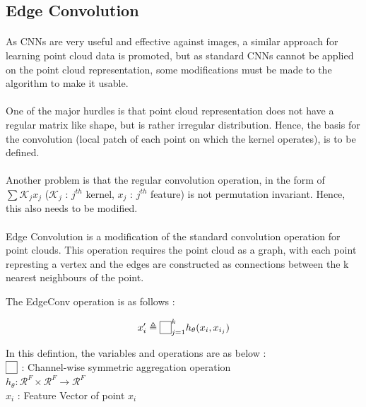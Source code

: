 \subsection{Edge Convolution}

\paragraph{} As CNNs are very useful and effective against images, a similar approach for 
learning point cloud data is promoted, but as standard CNNs cannot be applied 
on the point cloud representation, some modifications must be made to the 
algorithm to make it usable.
\paragraph{} One of the major hurdles is that point cloud representation does not have 
a regular matrix like shape, but is rather irregular distribution. Hence, 
the basis for the convolution (local patch of each point on which the 
kernel operates), is to be defined.
\paragraph{} Another problem is that the regular convolution operation, in the form of 
$\sum \mathcal{K}_jx_j$ ($\mathcal{K}_j$ : $j^{th}$ kernel, $x_j$ : $j^{th}$ 
feature) is not permutation invariant. Hence, this also needs to be 
modified.

\paragraph{} Edge Convolution is a modification of the standard convolution operation 
for point clouds. This operation requires the point cloud as a graph, with 
each point represting a vertex and the edges are constructed as connections 
between the k nearest neighbours of the point.

\begin{definition}{}
    The EdgeConv operation is as follows :

    \begin{equation*}
        x_i' \triangleq \fbox{$\phantom{5}$}_{j=1}^k h_\theta(x_i,x_{i_j})
    \end{equation*}

    \noindent In this defintion, the variables and operations are as below :\\
    $\fbox{$\phantom{5}$}$ : Channel-wise symmetric aggregation operation\\
    $h_\theta : \mathcal{R}^F \times \mathcal{R}^F \rightarrow \mathcal{R}^F$\\
    $x_i$ : Feature Vector of point $x_i$
\end{definition}


